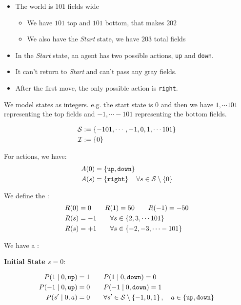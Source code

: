 \begin{itemize}
    \item The world is $101$ fields wide 
    \begin{itemize}
        \item We have $101$ top and $101$ bottom, that makes $202$
        \item We also have the \textit{Start} state, we have $203$ total fields
    \end{itemize}
    \item In the \textit{Start} state, an agent has two possible actions, \texttt{up} and \texttt{down}.
    \item It can't return to \textit{Start} and can't pass any gray fields.
    \item After the first move, the only possible action is \texttt{right}.
\end{itemize}


We model states as integers. e.g. the start state is $0$ and then we have $1,\cdots 101$ representing the top fields and $-1, \cdots -101$ representing the bottom fields. 

\begin{align*}
\mathcal{S} &:= \left\{-101, \cdots, -1, 0, 1, \cdots 101\right\} \\ 
\mathcal{I} &:= \left\{0\right\}
\end{align*}

For actions, we have:
\begin{align*}
A(0) &= \left\{\texttt{up}, \texttt{down}\right\} \\
A(s) &= \left\{\texttt{right}\right\} \quad \forall s \in \mathcal{S} \setminus \left\{0\right\}
\end{align*}

We define the :
\begin{align*}
R(0) &= 0 \qquad R(1) = 50 \qquad R(-1)=-50 \\ 
R(s) &= -1 \qquad \forall s \in \left\{2,3, \cdots 101\right\} \\
R(s) &= +1 \qquad \forall s \in \left\{-2,-3, \cdots -101\right\} \\
\end{align*}

We have a  :

\textbf{Initial State $s=0$}:

\begin{align*}
P(1 \mid 0, \texttt{up}) &= 1 \qquad P(1 \mid 0, \texttt{down}) = 0 \\ 
P(-1 \mid 0, \texttt{up}) &= 0 \qquad P(-1 \mid 0, \texttt{down}) = 1 \\ 
P(s' \mid 0,a) &= 0 \qquad \forall s' \in \mathcal{S} \setminus \left\{-1,0,1\right\}, \quad a \in \left\{\texttt{up}, \texttt{down}\right\}
\end{align*}

